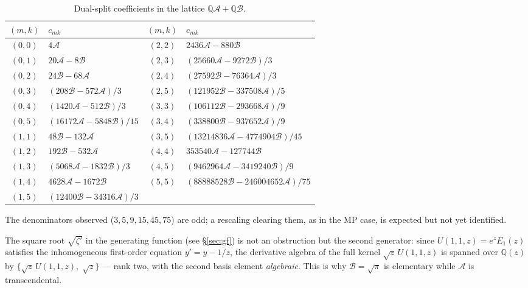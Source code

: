 \documentclass[11pt,a4paper]{article}
\newcommand{\Q}{\mathbb{Q}}
\begin{document}
\begin{table}[ht]
\centering
\small
\caption{Dual-split coefficients in the lattice
$\Q\mathcal A + \Q\mathcal B$.}\label{tab:lattice}
\begin{tabular}{cl@{\qquad}cl}
\toprule
$(m,k)$ & $c_{mk}$ & $(m,k)$ & $c_{mk}$ \\
\midrule
$(0,0)$ & $4\mathcal A$                       & $(2,2)$ & $2436\mathcal A - 880\mathcal B$ \\
$(0,1)$ & $20\mathcal A - 8\mathcal B$        & $(2,3)$ & $(25660\mathcal A - 9272\mathcal B)/3$ \\
$(0,2)$ & $24\mathcal B - 68\mathcal A$       & $(2,4)$ & $(27592\mathcal B - 76364\mathcal A)/3$ \\
$(0,3)$ & $(208\mathcal B - 572\mathcal A)/3$ & $(2,5)$ & $(121952\mathcal B - 337508\mathcal A)/5$ \\
$(0,4)$ & $(1420\mathcal A - 512\mathcal B)/3$ & $(3,3)$ & $(106112\mathcal B - 293668\mathcal A)/9$ \\
$(0,5)$ & $(16172\mathcal A - 5848\mathcal B)/15$ & $(3,4)$ & $(338800\mathcal B - 937652\mathcal A)/9$ \\
$(1,1)$ & $48\mathcal B - 132\mathcal A$      & $(3,5)$ & $(13214836\mathcal A - 4774904\mathcal B)/45$ \\
$(1,2)$ & $192\mathcal B - 532\mathcal A$     & $(4,4)$ & $353540\mathcal A - 127744\mathcal B$ \\
$(1,3)$ & $(5068\mathcal A - 1832\mathcal B)/3$ & $(4,5)$ & $(9462964\mathcal A - 3419240\mathcal B)/9$ \\
$(1,4)$ & $4628\mathcal A - 1672\mathcal B$   & $(5,5)$ & $(88888528\mathcal B - 246004652\mathcal A)/75$ \\
$(1,5)$ & $(12400\mathcal B - 34316\mathcal A)/3$ & & \\
\bottomrule
\end{tabular}
\end{table}

The denominators observed ($3, 5, 9, 15, 45, 75$) are odd; a
rescaling clearing them, as in the MP case, is expected but not yet
identified.

The square root $\sqrt{\zeta'}$ in the generating function
(see \S\ref{sec:gf}) is not an obstruction but the second generator:
since $U(1,1,z) = e^z E_1(z)$ satisfies the inhomogeneous first-order
equation $y' = y - 1/z$, the derivative algebra of the full kernel
$\sqrt{z}\,U(1,1,z)$ is spanned over $\Q(z)$ by
$\{\sqrt z\, U(1,1,z),\; \sqrt z\}$ --- rank two, with the second
basis element \emph{algebraic}. This is why $\mathcal B = \sqrt\pi$
is elementary while $\mathcal A$ is transcendental.
\end{document}
